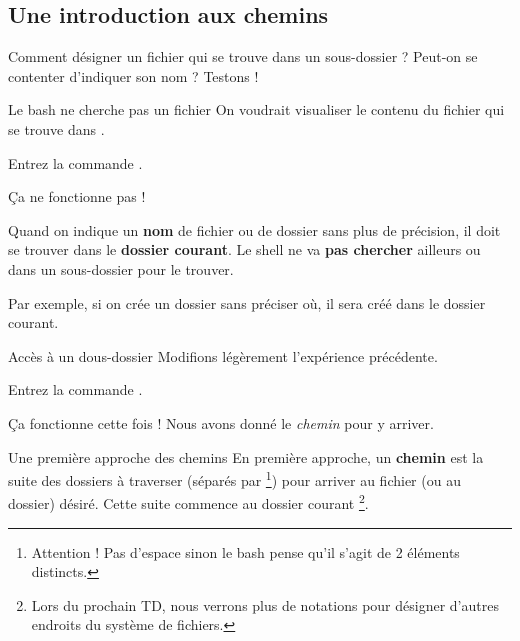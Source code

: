 \documentclass[a4paper,11pt]{style-esi/td}
\begin{document}
	\subsection{Une introduction aux chemins}

		Comment désigner un fichier qui se trouve dans un sous-dossier ?
		Peut-on se contenter d'indiquer son nom ? Testons !

		\begin{Experience}{Le bash ne cherche pas un fichier}
			On voudrait visualiser le contenu du fichier 
			qui se trouve dans .
			\begin{steps}
			\item 
				Entrez la commande .
			\end{steps}
			\c Ca ne fonctionne pas !
		\end{Experience}

		\begin{alertbox}
			Quand on indique un \textbf{nom} de fichier ou de dossier sans plus de précision,
			il doit se trouver dans le \textbf{dossier courant}.
			Le shell ne va \textbf{pas chercher} ailleurs ou dans un sous-dossier 
			pour le trouver. 
		\end{alertbox}

		Par exemple, si on crée un dossier sans préciser où,
		il sera créé dans le dossier courant.

\newpage

		\begin{Experience}{Accès à un dous-dossier}
			Modifions légèrement l'expérience précédente.
			\begin{steps}
			\item 
				Entrez la commande \kbd{cat dev1/readme}.
			\end{steps}
			\c Ca fonctionne cette fois !
			Nous avons donné le \emph{chemin} pour y arriver.
		\end{Experience}

		\begin{theorie}{Une première approche des chemins}
			En première approche, un \textbf{chemin}
			est la suite des dossiers à traverser 
			(séparés par \samp{/}%
			\footnote{%
				Attention ! Pas d'espace sinon le bash pense 
				qu'il s'agit de 2 éléments distincts.
			})
			pour arriver au fichier
			(ou au dossier) désiré.
			Cette suite commence au dossier courant%
			\footnote{%
				Lors du prochain TD, 
				nous verrons plus de notations pour désigner 
				d'autres endroits du système de fichiers.
			}.
		\end{theorie}
\end{document}

